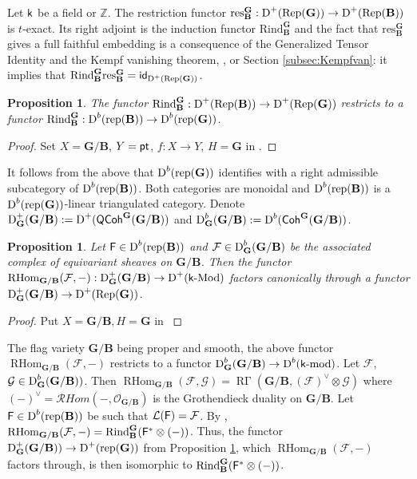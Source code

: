 \documentclass[sn-mathphys-num]{sn-jnl}%
\newcommand{\Oo}{\mathcal O}
\newcommand{\Ff}{\mathcal F}
\newcommand{\Ll}{\mathcal L}
\newcommand{\rep}{{\mathrm{rep}}}
\newcommand{\res}{{\mathrm{res}}}
\newcommand{\Rind}{{\mathrm{Rind}}}
\newcommand{\Rep}{{\mathrm{Rep}}}
\newcommand*{\Dd}{\mathop{\mathrm D\kern0pt}\nolimits}
\newcommand*{\RGamma}{\mathop{\mathrm {R\Gamma}}\nolimits}
\newcommand*{\RHom}{\mathop{\mathrm {RHom}}\nolimits}
\newcommand{\QCoh}{\mathsf{QCoh}}
\newcommand{\sk}{{\sf k}}
\newcommand{\Z}{{\mathbb Z}}
\newcommand{\kmod}{\sk\textrm{-}\mathrm{mod}}
\newcommand{\kMod}{\sk\textrm{-}\mathrm{Mod}}
\newcommand{\bg}{\mathbf G}
\newcommand{\fb}{\mathbf B}
\newtheorem{proposition}[theorem]{Proposition}
\theoremstyle{definition}
\begin{document}
Let $\sk$ be a field or $\Z$.
The restriction functor $\res_{\fb}^{ \bg}: \Dd^+ (\Rep ( \bg))\rightarrow \Dd^+ (\Rep ({\fb}))$ is $t$-exact. 
Its right adjoint is the induction functor $\Rind_{\fb}^{ \bg}$ and the fact that $\res_{\fb}^{ \bg}$ gives a full faithful embedding is a consequence of the Generalized Tensor Identity \cite[I Proposition 4.8]{Jan} and the Kempf vanishing theorem, \cite[Theorem 1.2]{CPSWvdK}, \cite[B.3]{Jan} or Section \ref{subsec:Kempfvan}: 
it implies that $\Rind_{\fb}^{ \bg}\res_{\fb}^{ \bg}={\sf id}_{\Dd^+ (\Rep ( \bg))}$. 

\begin{proposition}
The functor $\Rind_{\fb}^{ \bg}: \Dd ^+(\Rep( \fb))\rightarrow \Dd ^+(\Rep( \bg))$ restricts to a functor $\Rind_{\fb}^{ \bg}: \Dd ^b(\rep( \fb))\rightarrow \Dd ^b(\rep( \bg))$. 
\end{proposition}

\begin{proof}
Set $X= \bg/ \fb$, $Y={\sf pt}$, $f:X\rightarrow Y$, $H= \bg$ in \cite[Proposition A.12]{MR}.
\end{proof}

It follows from the above that $\Dd ^b(\rep ( \bg))$ identifies with a right admissible subcategory of $\Dd^b(\rep ({\fb}))$. 
Both categories are monoidal and $\Dd^b(\rep ({\fb}))$ is a $\Dd ^b(\rep ( \bg))$-linear triangulated category. 
Denote $\Dd ^+_{ \bg}( \bg/ \fb):=\Dd ^+({\QCoh}^{ \bg}( \bg/ \fb))
$ and $\Dd ^b_{ \bg}( \bg/ \fb):=\Dd ^b({\sf Coh}^{ \bg}( \bg/ \fb))$.

\begin{proposition}\label{prop:Hom-ind_factorisation}
Let ${\sf F}\in \Dd ^b(\rep( \fb))$ and $\Ff \in \Dd ^b_{ \bg}( \bg/ \fb)$ be the associated complex of equivariant sheaves on $ \bg/ \fb$. 
Then the functor $\RHom _{ \bg/\fb}(\Ff,-): \Dd ^+_{ \bg}( \bg/ \fb)\rightarrow \Dd ^+(\kMod)$ factors canonically through a functor $\Dd ^+_{ \bg}( \bg/ \fb)\rightarrow \Dd ^+(\Rep( \bg))$. 
\end{proposition}

\begin{proof}
Put $X= \bg/ \fb, H= \bg$ in \cite[Appendix, Corollary A.5]{MR}
\end{proof}


The flag variety $ \bg/ \fb$ being proper and smooth, the above functor $\RHom _{ \bg/\fb}(\Ff,-)$ restricts to a functor $\Dd ^b_{ \bg}( \bg/ \fb)\rightarrow \Dd ^b(\kmod)$. 
Let $\Ff$, ${\mathcal G}\in \Dd ^b_{ \bg}( \bg/ \fb))$. Then $\RHom _{ \bg/\fb}(\Ff,\mathcal G)=\RGamma ( \bg/ \fb,(\Ff)^{\vee}\otimes {\mathcal G})$ where $(-)^{\vee}={\mathcal{R}\mathit{Hom}}(-,\Oo _{ \bg/\fb})$ is the Grothendieck duality on $ \bg/ \fb$. Let ${\sf F}\in \Dd^b(\rep (\fb ))$ be such that $\Ll (\sf F)=\Ff$. By \cite[Corollary 2.9]{CPSMackey}, $\RHom _{\bg/\fb}(\Ff,-)=\Rind _{\fb}^{\bg}({\sf F}^{\ast}\otimes (-))$. Thus, the functor $\Dd ^+_{\bg}(\bg/\fb))\rightarrow \Dd ^+(\rep(\bg))$ from Proposition \ref{prop:Hom-ind_factorisation}, which $\RHom _{\bg/\fb}(\Ff,-)$ factors through, is then isomorphic to  $\Rind _{\fb}^{\bg}({\sf F}^{\ast}\otimes (-))$.
\
\end{document}
